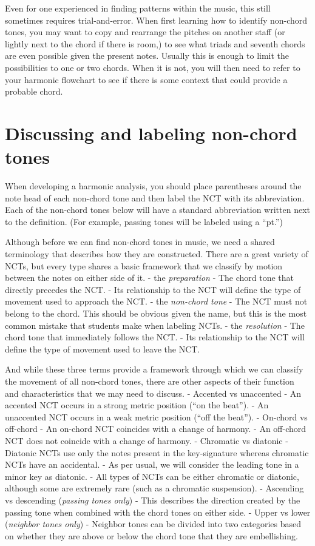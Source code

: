 \documentclass{book}
\begin{document}
Even for one experienced in finding patterns within the music, this still
sometimes requires trial-and-error. When first learning how to identify
non-chord tones, you may want to copy and rearrange the pitches on another
staff (or lightly next to the chord if there is room,) to see what triads and
seventh chords are even possible given the present notes. Usually this is
enough to limit the possibilities to one or two chords. When it is not, you
will then need to refer to your harmonic flowchart to see if there is some
context that could provide a probable chord.

\hypertarget{discussing-and-labeling-non-chord-tones}{%
\section{Discussing and labeling non-chord
tones}\label{discussing-and-labeling-non-chord-tones}}

When developing a harmonic analysis, you should place parentheses around the
note head of each non-chord tone and then label the NCT with its abbreviation.
Each of the non-chord tones below will have a standard abbreviation written
next to the definition. (For example, passing tones will be labeled using a
``pt.'')

Although before we can find non-chord tones in music, we need a shared
terminology that describes how they are constructed. There are a great variety
of NCTs, but every type shares a basic framework that we classify by motion
between the notes on either side of it. - the \emph{preparation} - The chord
tone that directly precedes the NCT. - Its relationship to the NCT will define
the type of movement used to approach the NCT. - the \emph{non-chord tone} -
The NCT must not belong to the chord. This should be obvious given the name,
but this is the most common mistake that students make when labeling NCTs. -
the \emph{resolution} - The chord tone that immediately follows the NCT. - Its
relationship to the NCT will define the type of movement used to leave the
NCT.

And while these three terms provide a framework through which we can classify
the movement of all non-chord tones, there are other aspects of their function
and characteristics that we may need to discuss. - Accented vs unaccented - An
accented NCT occurs in a strong metric position (``on the beat''). - An
unaccented NCT occurs in a weak metric position (``off the beat''). - On-chord
vs off-chord - An on-chord NCT coincides with a change of harmony. - An
off-chord NCT does not coincide with a change of harmony. - Chromatic vs
diatonic - Diatonic NCTs use only the notes present in the key-signature
whereas chromatic NCTs have an accidental. - As per usual, we will consider
the leading tone in a minor key as diatonic. - All types of NCTs can be either
chromatic or diatonic, although some are extremely rare (such as a chromatic
suspension). - Ascending vs descending (\emph{passing tones only}) - This
describes the direction created by the passing tone when combined with the
chord tones on either side. - Upper vs lower (\emph{neighbor tones only}) -
Neighbor tones can be divided into two categories based on whether they are
above or below the chord tone that they are embellishing.
\end{document}
